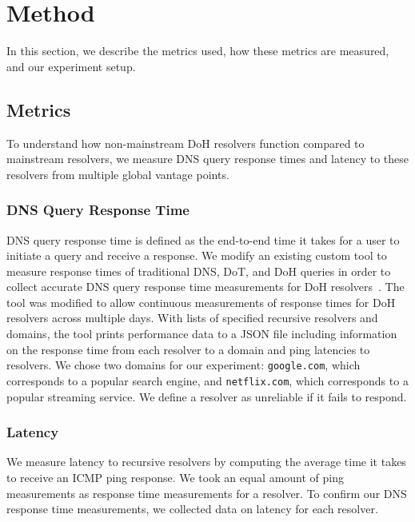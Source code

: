\section{Method}\label{sec:method}
In this section, we describe the metrics used, how these metrics are measured, and our experiment setup.

\subsection{Metrics}
To understand how non-mainstream DoH resolvers function compared to mainstream resolvers, we measure DNS query response times and latency to these resolvers from multiple global vantage points.

\subsubsection{DNS Query Response Time}
DNS query response time is defined as the end-to-end time it takes for a user to initiate a query and receive a response.
We modify an existing custom tool to measure response times of traditional DNS, DoT, and DoH queries in order to collect accurate DNS query response time measurements for DoH resolvers~\cite{hounsel2020comparing}.
The tool was modified to allow continuous measurements of response times for DoH resolvers across multiple days.
With lists of specified recursive resolvers and domains, the tool prints performance data to a JSON file including information on the response time from each resolver to a domain and ping latencies to resolvers.
We chose two domains for our experiment: \texttt{google.com}, which corresponds to a popular search engine, and \texttt{netflix.com}, which corresponds to a popular streaming service.
We define a resolver as unreliable if it fails to respond.  

\subsubsection{Latency}
We measure latency to recursive resolvers by computing the average time it takes to receive an ICMP ping response.
We took an equal amount of ping measurements as response time measurements for a resolver.
To confirm our DNS response time measurements, we collected data on latency for each resolver. 

